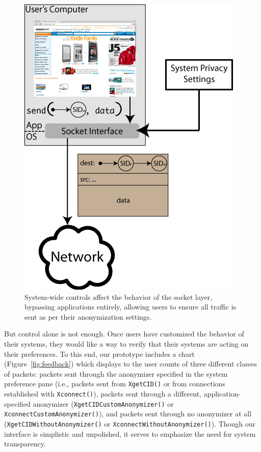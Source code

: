 \documentclass{article}
\begin{document}
\begin{figure}
\centering
\includegraphics[scale=0.75]{images/socket-control.png}
\caption{System-wide controls affect the behavior of the socket layer, bypassing applications entirely, allowing users to ensure all traffic is sent as per their anonymization settings.}
\label{fig:socket-control}
\end{figure}

But control alone is not enough. Once users have customized the behavior of their systems, they would like a way to verify that their systems are acting on their preferences. To this end, our prototype includes a chart (Figure~\ref{fig:feedback}) which displays to the user counts of three different classes of packets: packets sent through the anonymizer specified in the system preference pane (i.e., packets sent from \texttt{XgetCID()} or from connections established with \texttt{Xconnect()}), packets sent through a different, application-specified anonymizer (\texttt{XgetCIDCustomAnonymizer()} or \texttt{XconnectCustomAnonymizer()}), and packets sent through no anonymizer at all (\texttt{XgetCIDWithoutAnonymizer()} or \texttt{XconnectWithoutAnonymizer()}). Though our interface is simplistic and unpolished, it serves to emphasize the need for system transparency.
\end{document}
